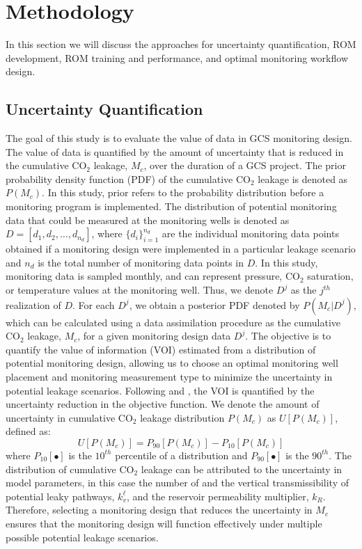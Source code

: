 \documentclass[a4paper,fleqn]{cas-sc}
\begin{document}
\section{Methodology}
In this section we will discuss the approaches for uncertainty quantification, ROM development, ROM training and performance, and optimal monitoring workflow design.

\subsection{Uncertainty Quantification}
The goal of this study is to evaluate the value of data in GCS monitoring design. The value of data is quantified by the amount of uncertainty that is reduced in the cumulative CO$_2$ leakage, $M_c$, over the duration of a GCS project. The prior probability density function (PDF) of the cumulative CO$_2$ leakage is denoted as $P(M_c)$. In this study, prior refers to the probability distribution before a monitoring program is implemented. The distribution of potential monitoring data that could be measured at the monitoring wells is denoted as $D=[d_1,d_2,\ldots,d_{n_d}]$, where $\{d_i\}_{i=1}^{n_d}$ are the individual monitoring data points obtained if a monitoring design were implemented in a particular leakage scenario and $n_d$ is the total number of monitoring data points in $D$. In this study, monitoring data is sampled monthly, and can represent pressure, CO$_2$ saturation, or temperature values at the monitoring well. Thus, we denote $D^j$ as the $j^{th}$ realization of $D$. For each $D^j$, we obtain a posterior PDF denoted by $P(M_c \vert D^j)$, which can be calculated using a data assimilation procedure as the cumulative CO$_2$ leakage, $M_c$, for a given monitoring design data $D^j$. The objective is to quantify the value of information (VOI) estimated from a distribution of potential monitoring design, allowing us to choose an optimal monitoring well placement and monitoring measurement type to minimize the uncertainty in potential leakage scenarios.
Following \citet{Chen2017328, Chen2018} and \citet{Le2014505}, the VOI is quantified by the uncertainty reduction in the objective function. We denote the amount of uncertainty in cumulative CO$_2$ leakage distribution $P(M_c)$ as $U[P(M_c)]$, defined as:
\begin{equation} \label{eq:1}
    U[P(M_c)] = P_{90}[P(M_c)] - P_{10}[P(M_c)]
\end{equation}
where $P_{10}[\bullet]$ is the $10^{th}$ percentile of a distribution and $P_{90}[\bullet]$ is the $90^{th}$. The distribution of cumulative CO$_2$ leakage can be attributed to the uncertainty in model parameters, in this case the number of and the vertical transmissibility of potential leaky pathways, $k_v^\ell$, and the reservoir permeability multiplier, $k_R$. Therefore, selecting a monitoring design that reduces the uncertainty in $M_c$ ensures that the monitoring design will function effectively under multiple possible potential leakage scenarios.
\end{document}
